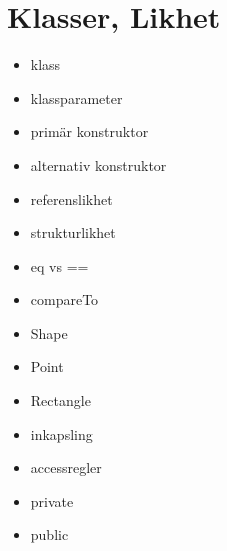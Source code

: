 \chapter{Klasser, Likhet}\label{chapter:W06}
\begin{multicols}{2}\begin{itemize}[nosep,label={$\square$}]
\item klass
\item klassparameter
\item primär konstruktor
\item alternativ konstruktor
\item referenslikhet
\item strukturlikhet
\item eq vs ==
\item compareTo
\item Shape
\item Point
\item Rectangle
\item inkapsling
\item accessregler
\item private
\item public\end{itemize}\end{multicols}
